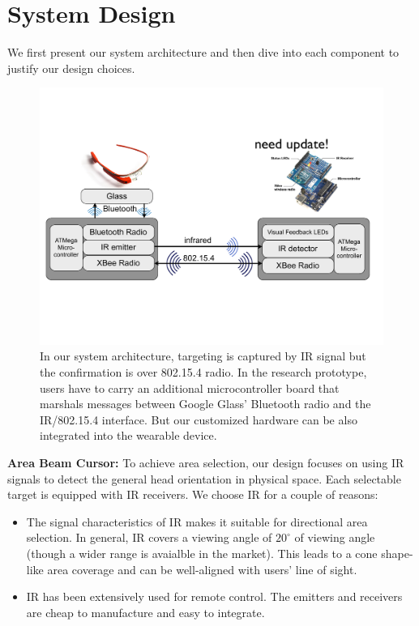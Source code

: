 \section{System Design}
We first present our system architecture and then dive into each component to justify our design choices.

\begin{figure}[t]
\centering
\includegraphics[width=0.9\columnwidth]{figures/architecture.pdf}
\caption{In our system architecture, targeting is captured by IR signal but the confirmation is over 802.15.4 radio. In the research prototype, users have to carry an additional microcontroller board that marshals messages between Google Glass' Bluetooth radio and the IR/802.15.4 interface. But our customized hardware can be also integrated into the wearable device.}
\label{fig:architecture}
\end{figure}

{\bf Area Beam Cursor:} To achieve area selection, our design focuses on using IR signals to detect the general head orientation in physical space. Each selectable target is equipped with IR receivers. We choose IR for a couple of reasons:
\begin{itemize}
\item The signal characteristics of IR makes it suitable for directional area selection. In general, IR covers a viewing angle of $20^\circ$ of viewing angle (though a wider range is avaialble in the market). This leads to a cone shape-like area coverage and can be well-aligned with users' line of sight. 
\item IR has been extensively used for remote control. The emitters and receivers are cheap to manufacture and easy to integrate.
\end{itemize}

